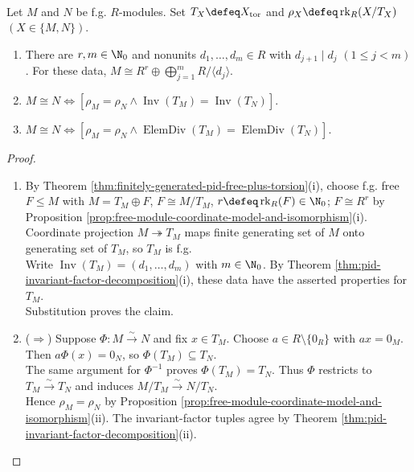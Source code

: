 \begin{corollary} \label{cor:general-finitely-generated-pid-module-classification} \\
Let $M$ and $N$ be f.g. $R$-modules. Set $T_X\defeq X_{\operatorname{tor}}$ and $\rho_X\defeq\operatorname{rk}_R(X/T_X)$ $(X\in\{M,N\})$.
\begin{enumerate}[label=(\roman*)]
\setlength{\itemsep}{0pt}
\item There are $r,m\in\N_0$ and nonunits $d_1,\ldots,d_m\in R$ with $d_{j+1}\mid d_j$ $(1\leq j<m)$. For these data, $M\cong R^r\oplus\bigoplus\limits_{j=1}^mR/\langle d_j\rangle$.
\item $M\cong N\Longleftrightarrow[\rho_M=\rho_N\land\operatorname{Inv}(T_M)=\operatorname{Inv}(T_N)]$.
\item $M\cong N\Longleftrightarrow[\rho_M=\rho_N\land\operatorname{ElemDiv}(T_M)=\operatorname{ElemDiv}(T_N)]$.
\end{enumerate}
\begin{proof}
\begin{enumerate}[label=(\roman*)]
\setlength{\itemsep}{0pt}
\item[$(i)$] By Theorem \ref{thm:finitely-generated-pid-free-plus-torsion}(i), choose f.g. free $F\leq M$ with $M=T_M\oplus F$, $F\cong M/T_M$, $r\defeq\operatorname{rk}_R(F)\in\N_0$; $F\cong R^r$ by Proposition \ref{prop:free-module-coordinate-model-and-isomorphism}(i).\\
Coordinate projection $M\twoheadrightarrow T_M$ maps finite generating set of $M$ onto generating set of $T_M$, so $T_M$ is f.g.\\
Write $\operatorname{Inv}(T_M)=(d_1,\ldots,d_m)$ with $m\in\N_0$. By Theorem \ref{thm:pid-invariant-factor-decomposition}(i), these data have the asserted properties for $T_M$.\\
Substitution proves the claim.
\item[$(ii)$] ($\Rightarrow$) Suppose $\Phi:M\xrightarrow{\sim}N$ and fix $x\in T_M$. Choose $a\in R\setminus\{0_R\}$ with $ax=0_M$. Then $a\Phi(x)=0_N$, so $\Phi(T_M)\subseteq T_N$.\\
The same argument for $\Phi^{-1}$ proves $\Phi(T_M)=T_N$. Thus $\Phi$ restricts to $T_M\xrightarrow{\sim}T_N$ and induces $M/T_M\xrightarrow{\sim}N/T_N$.\\
Hence $\rho_M=\rho_N$ by Proposition \ref{prop:free-module-coordinate-model-and-isomorphism}(ii). The invariant-factor tuples agree by Theorem \ref{thm:pid-invariant-factor-decomposition}(ii).

\end{enumerate}
\end{proof}
\end{corollary}

